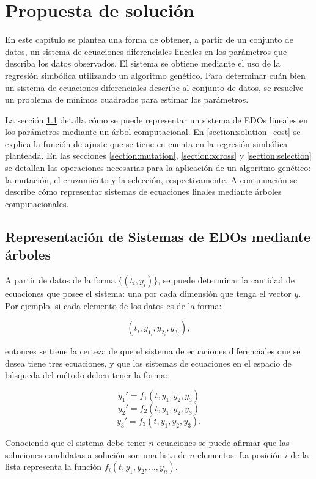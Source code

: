 \chapter{Propuesta de solución}\label{chapter:solution_proposal}

En este capítulo se plantea una forma de obtener, a partir de un conjunto de datos, un sistema de ecuaciones diferenciales lineales en los parámetros que describa los datos observados. El sistema se obtiene mediante el uso de la regresión simbólica utilizando un algoritmo genético. Para determinar cuán bien un sistema de ecuaciones diferenciales describe al conjunto de datos, se resuelve un problema de mínimos cuadrados para estimar los parámetros.

La sección \ref{section:solution_representation} detalla cómo se puede representar un sistema de EDOs lineales en los parámetros mediante un árbol computacional. En \ref{section:solution_cost} se explica la función de ajuste que se tiene en cuenta en la regresión simbólica planteada. En las secciones \ref{section:mutation}, \ref{section:xcross} y \ref{section:selection} se detallan las operaciones necesarias para la aplicación de un algoritmo genético: la mutación, el cruzamiento y la selección, respectivamente. A continuación se describe cómo representar sistemas de ecuaciones linales mediante árboles computacionales.


\section{Representación de Sistemas de EDOs mediante árboles}\label{section:solution_representation}

A partir de datos de la forma $\{(t_i, y_i)\}$, se puede determinar la cantidad de ecuaciones que posee el sistema: una por cada dimensión que tenga el vector $y$. Por ejemplo, si cada elemento de los datos es de la forma:

$$(t_i, y_{1_i}, y_{2_i}, y_{3_i}),$$

entonces se tiene la certeza de que el sistema de ecuaciones diferenciales que se desea tiene tres ecuaciones, y que los sistemas de ecuaciones en el espacio de búsqueda del método deben tener la forma:

$$y_1' = f_1(t, y_1, y_2, y_3)$$
$$y_2' = f_2(t, y_1, y_2, y_3)$$
$$y_3' = f_3(t, y_1, y_2, y_3).$$

Conociendo que el sistema debe tener $n$ ecuaciones se puede afirmar que las soluciones candidatas a solución son una lista de $n$ elementos. La posición $i$ de la lista representa la función $f_i(t,y_1,y_2, \dots, y_n)$.

